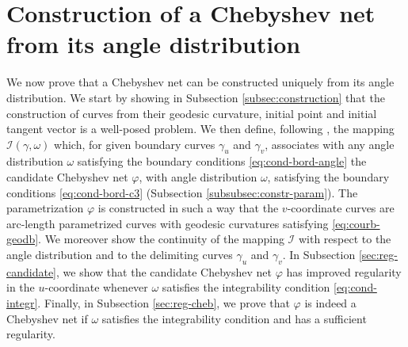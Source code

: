 \documentclass{article}
\newcommand{\I}{\mathcal{I}}
\theoremstyle{remark}
\theoremstyle{prpart}
\begin{document}
\section{Construction of a Chebyshev net from its angle distribution}\label{subsec:constr-param}
We now prove that a Chebyshev net can be constructed uniquely from its angle distribution. We start by showing in Subsection \ref{subsec:construction} that the construction of curves from their geodesic curvature, initial point and initial tangent vector is a well-posed problem. We then define, following \cite{Ghys09}, the mapping $\I(\gamma,\omega)$ which, for given boundary curves $\gamma_u$ and $\gamma_v$, associates with any angle distribution $\omega$ satisfying the boundary conditions \eqref{eq:cond-bord-angle} the candidate Chebyshev net $\varphi$, with angle distribution $\omega$, satisfying the boundary conditions \eqref{eq:cond-bord-c3} (Subsection \ref{subsubsec:constr-param}). The parametrization $\varphi$ is constructed in such a way that the $v$-coordinate curves are arc-length parametrized curves with geodesic curvatures satisfying \eqref{eq:courb-geodb}. We moreover show the continuity of the mapping $\I$ with respect to the angle distribution and to the delimiting curves $\gamma_u$ and $\gamma_v$. In Subsection \ref{sec:reg-candidate}, we show that the candidate Chebyshev net $\varphi$ has improved regularity in the $u$-coordinate whenever $\omega$ satisfies the integrability condition \eqref{eq:cond-integr}. Finally, in Subsection \ref{sec:reg-cheb}, we prove that $\varphi$ is indeed a Chebyshev net if $\omega$ satisfies the integrability condition and has a sufficient regularity.
\end{document}
